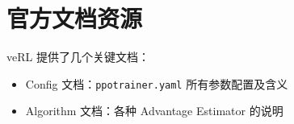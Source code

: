 \section{官方文档资源}
veRL 提供了几个关键文档：
\begin{itemize}
  \item Config 文档：\texttt{ppotrainer.yaml} 所有参数配置及含义
  \item Algorithm 文档：各种 Advantage Estimator 的说明
\end{itemize}

